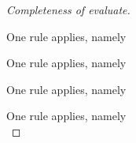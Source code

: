 \begin{proof}[Completeness of evaluate]
{    }

    {One rule applies, namely \\

    }

    {One rule applies, namely \\

    }

    {One rule applies, namely \\

    }

    {  One rule applies, namely \\

}
\end{proof}
